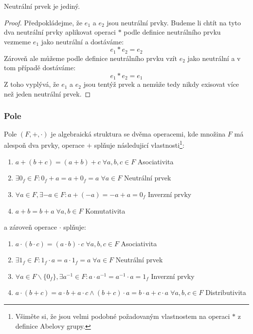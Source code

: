 \begin{theorem}
    Neutrální prvek je jediný.
\end{theorem}
\begin{proof}
    Předpokládejme, že $e_1$ a $e_2$ jsou neutrální prvky. Budeme li chtít na tyto dva neutrální
    prvky aplikovat operaci $*$ podle definice neutrálního prvku vezmeme $e_1$ jako neutrální a
    dostáváme:
    $$e_1 * e_2 = e_2$$
    Zároveň ale můžeme podle definice neutrálního prvku vzít $e_2$ jako neutrální a v tom případě
    dostáváme:
    $$e_1 * e_2 = e_1$$
    Z toho vyplývá, že $e_1$ a $e_2$ jsou tentýž prvek a nemůže tedy nikdy exisovat více než
    jeden neutrální prvek.
\end{proof}

\subsubsection{Pole}
\begin{definition}[Pole]
    Pole $(F, +, \cdot)$ je algebraická struktura se dvěma operacemi, kde množina $F$ má alespoň
    dva prvky, operace $+$ splňuje následujicí vlastnosti\footnote{Všiměte si, že jsou velmi podobné
    požadovaným vlastnostem na operaci $*$ z definice Abelovy grupy.}:
    \begin{enumerate}
        \item $a + (b + c) = (a + b) + c \; \forall a, b, c \in F$ \hfill Asociativita
        \item $\exists 0_f \in F: 0_f + a = a + 0_f = a \; \forall a \in F$ \hfill Neutrální prvek
        \item $\forall a \in F, \exists -a \in F: a + (-a) = -a + a = 0_f$ \hfill Inverzní prvky
        \item $a + b = b + a \; \forall a, b \in F$ \hfill Komutativita
    \end{enumerate}
    a zároveň operace $\cdot$ splňuje:
    \begin{enumerate}
        \item $a \cdot (b \cdot c) = (a \cdot b) \cdot c \; \forall a, b, c \in F$ \hfill Asociativita
        \item $\exists 1_f \in F: 1_f \cdot a = a \cdot 1_f = a \; \forall a \in F$ \hfill Neutrální prvek
        \item $\forall a \in F \smallsetminus \{0_f\}, \exists a^{-1} \in F: a \cdot
        a^{-1} = a^{-1} \cdot a = 1_f$ \hfill Inverzní prvky
        \item $a \cdot (b + c) = a \cdot b + a \cdot c \wedge (b + c) \cdot a = b \cdot a + c \cdot a
        \; \forall a, b,c \in F$ \hfill Distributivita

    \end{enumerate}
    \label{def:field}
\end{definition}

